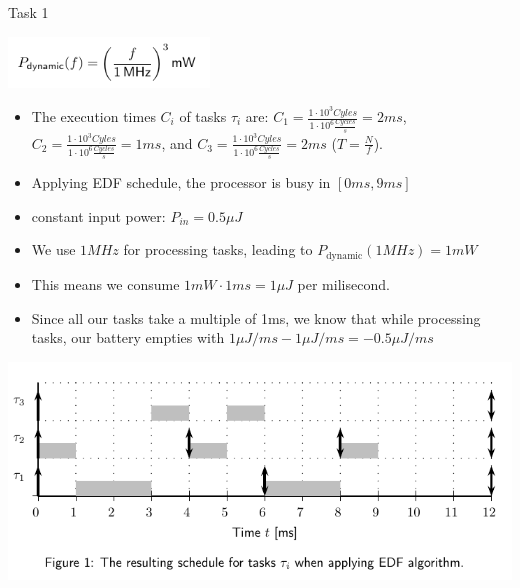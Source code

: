 \begin{frame}[allowframebreaks]{Task 1}{}
\begin{tasknoinc}
    \includegraphics[width=0.4\textwidth]{./figures/task1_power.png}
  \end{tasknoinc}
  \begin{solutionnoinc}
    \begin{itemize}
      \item The execution times $C_i$ of tasks $\tau_i$ are: $C_1 = \frac{1 \cdot 10^3 Cyles}{1 \cdot 10^6 \frac{Cycles}{s}} =  2 ms$, $C_2 = \frac{1 \cdot 10^3 Cyles}{1 \cdot 10^6 \frac{Cycles}{s}} =  1 ms$, and $C_3 = \frac{1 \cdot 10^3 Cyles}{1 \cdot 10^6 \frac{Cycles}{s}}  = 2 ms$ ($T = \frac{N}{f}$).
      \item Applying EDF schedule, the processor is busy in $[0 ms, 9 ms]$
      \item constant input power: $P_{in} = 0.5\mu J$
      \item We use $1MHz$ for processing tasks, leading to $P_{\text{dynamic}}(1MHz) = 1mW$
      \item This means we consume $1mW \cdot 1ms = 1\mu J$ per milisecond.
      \item Since all our tasks take a multiple of 1ms, we know that while processing tasks, our battery empties with $1\mu J/ms - 1\mu J/ms = -0.5\mu J/ms$
    \end{itemize}
  \end{solutionnoinc}
    \begin{solutionnoinc}
    \centering
    \includegraphics[height=0.6\paperheight]{./figures/task1_schedule.png}
  \end{solutionnoinc}

\end{frame}
